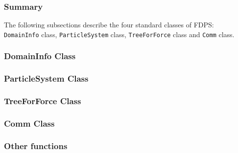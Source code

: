 \subsubsection{Summary}

The following subsections describe the four standard classes of FDPS:
{\tt DomainInfo} class, {\tt ParticleSystem} class, {\tt TreeForForce}
class and {\tt Comm} class.


\subsubsection{DomainInfo Class}



\subsubsection{ParticleSystem Class}



\subsubsection{TreeForForce Class}



\subsubsection{Comm Class}
\label{sect:CommDataClass}


\subsubsection{Other functions}



